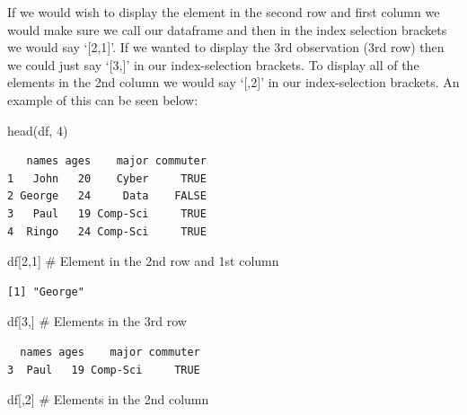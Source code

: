 \documentclass[
  letterpaper,
  DIV=11,
  numbers=noendperiod]{scrreprt}
\newenvironment{Shaded}{\begin{snugshade}}{\end{snugshade}}
\newcommand{\CommentTok}[1]{\textcolor[rgb]{0.37,0.37,0.37}{#1}}
\newcommand{\DecValTok}[1]{\textcolor[rgb]{0.68,0.00,0.00}{#1}}
\newcommand{\FunctionTok}[1]{\textcolor[rgb]{0.28,0.35,0.67}{#1}}
\newcommand{\NormalTok}[1]{\textcolor[rgb]{0.00,0.23,0.31}{#1}}
\begin{document}
If we would wish to display the element in the second row and first
column we would make sure we call our dataframe and then in the index
selection brackets we would say `{[}2,1{]}'. If we wanted to display the
3rd observation (3rd row) then we could just say `{[}3,{]}' in our
index-selection brackets. To display all of the elements in the 2nd
column we would say `{[},2{]}' in our index-selection brackets. An
example of this can be seen below:

\begin{Shaded}
\begin{Highlighting}[]
\FunctionTok{head}\NormalTok{(df, }\DecValTok{4}\NormalTok{)}
\end{Highlighting}
\end{Shaded}

\begin{verbatim}
   names ages    major commuter
1   John   20    Cyber     TRUE
2 George   24     Data    FALSE
3   Paul   19 Comp-Sci     TRUE
4  Ringo   24 Comp-Sci     TRUE
\end{verbatim}

\begin{Shaded}
\begin{Highlighting}[]
\NormalTok{df[}\DecValTok{2}\NormalTok{,}\DecValTok{1}\NormalTok{] }\CommentTok{\# Element in the 2nd row and 1st column}
\end{Highlighting}
\end{Shaded}

\begin{verbatim}
[1] "George"
\end{verbatim}

\begin{Shaded}
\begin{Highlighting}[]
\NormalTok{df[}\DecValTok{3}\NormalTok{,] }\CommentTok{\# Elements in the 3rd row}
\end{Highlighting}
\end{Shaded}

\begin{verbatim}
  names ages    major commuter
3  Paul   19 Comp-Sci     TRUE
\end{verbatim}

\begin{Shaded}
\begin{Highlighting}[]
\NormalTok{df[,}\DecValTok{2}\NormalTok{] }\CommentTok{\# Elements in the 2nd column}
\end{Highlighting}
\end{Shaded}
\end{document}
